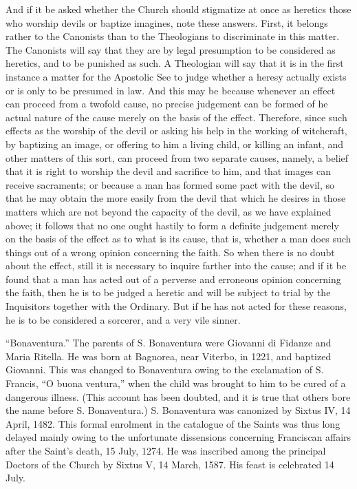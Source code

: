              And if it be asked whether the Church should stigmatize at once as heretics those who
       worship devils or baptize imagines, note these answers. First, it belongs rather to the
       Canonists than to the Theologians to discriminate in this matter. The Canonists will say that
       they are by legal presumption to be considered as heretics, and to be punished as such. A
       Theologian will say that it is in the first instance a matter for the Apostolic See to judge
       whether a heresy actually exists or is only to be presumed in law. And this may be because
       whenever an effect can proceed from a twofold cause, no precise judgement can be formed
       of he actual nature of the cause merely on the basis of the effect.
             Therefore, since such effects as the worship of the devil or asking his help in the
       working of witchcraft, by baptizing an image, or offering to him a living child, or killing an
       infant, and other matters of this sort, can proceed from two separate causes, namely, a belief
       that it is right to worship the devil and sacrifice to him, and that images can receive
       sacraments; or because a man has formed some pact with the devil, so that he may obtain
       the more easily from the devil that which he desires in those matters which are not beyond
       the capacity of the devil, as we have explained above; it follows that no one ought hastily to
       form a definite judgement merely on the basis of the effect as to what is its cause, that is,
       whether a man does such things out of a wrong opinion concerning the faith. So when there
       is no doubt about the effect, still it is necessary to inquire farther into the cause; and if it be
       found that a man has acted out of a perverse and erroneous opinion concerning the faith,
       then he is to be judged a heretic and will be subject to trial by the Inquisitors together with
       the Ordinary. But if he has not acted for these reasons, he is to be considered a sorcerer, and
       a very vile sinner.


           “Bonaventura.” The parents of S. Bonaventura were Giovanni di Fidanze and Maria
        Ritella. He was born at Bagnorea, near Viterbo, in 1221, and baptized Giovanni. This was
        changed to Bonaventura owing to the exclamation of S. Francis, “O buona ventura,” when
        the child was brought to him to be cured of a dangerous illness. (This account has been
        doubted, and it is true that others bore the name before S. Bonaventura.) S. Bonaventura
        was canonized by Sixtus IV, 14 April, 1482. This formal enrolment in the catalogue of the
        Saints was thus long delayed mainly owing to the unfortunate dissensions concerning
        Franciscan affairs after the Saint's death, 15 July, 1274. He was inscribed among the
        principal Doctors of the Church by Sixtus V, 14 March, 1587. His feast is celebrated 14
        July.



